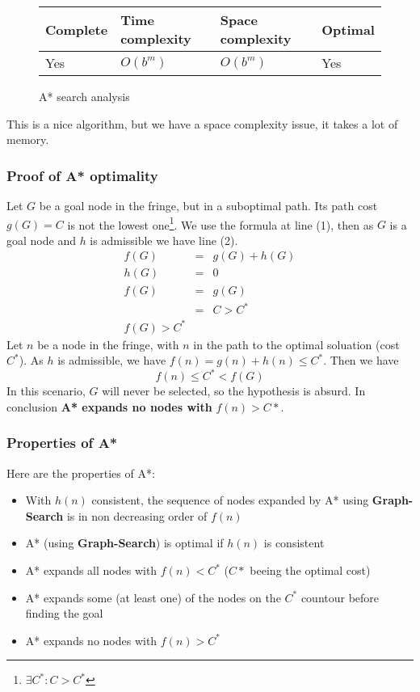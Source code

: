 \begin{figure}[H]
\centering
\begin{tabular}{|llll|}
\hline
\textbf{Complete} & \textbf{Time complexity} & \textbf{Space complexity} & \textbf{Optimal} \\
\hline
Yes & $O(b^m)$ & $O(b^m)$ & Yes\\
\hline
\end{tabular}
\caption{A* search analysis}
\end{figure}

This is a nice algorithm, but we have a space complexity issue, it takes a lot of memory.

\subsubsection{Proof of A* optimality}

Let $G$ be a goal node in the fringe, but in a suboptimal path. Its path cost $g(G)=C$ is not the lowest one\footnote{$\exists C^* : C > C^*$}. We use the formula at line (1), then as $G$ is a goal node and $h$ is admissible we have line (2). 
\begin{eqnarray}
f(G) &=& g(G) + h(G)\\
h(G) &=& 0\\
f(G) &=& g(G)\\
&=& C > C^*\\
f(G) > C^*
\end{eqnarray}
Let $n$ be a node in the fringe, with $n$ in the path to the optimal soluation (cost $C^*$). As $h$ is admissible, we have $f(n) = g(n) + h(n) \leq C^*$. Then we have
$$f(n) \leq C^* < f(G)$$
In this scenario, $G$ will never be selected, so the hypothesis is absurd. In conclusion \textbf{A* expands no nodes with} $f(n) > C*$.
\subsubsection{Properties of A*}

Here are the properties of A*:
\begin{itemize}
\item With $h(n)$ consistent, the sequence of nodes expanded by A* using \textbf{Graph-Search} is in non decreasing order of $f(n)$
\item A* (using \textbf{Graph-Search}) is optimal if $h(n)$ is consistent
\item A* expands all nodes with $f(n) < C^*$ ($C*$ beeing the optimal cost)
\item A* expands some (at least one) of the nodes on the $C^*$ countour before finding the goal
\item A* expands no nodes with $f(n) > C^*$ 
\end{itemize}

